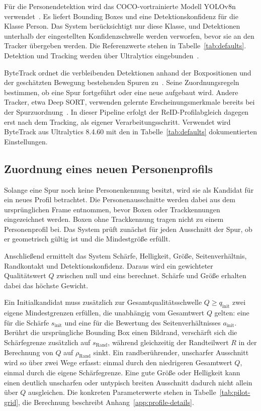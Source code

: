 \documentclass[runningheads,a4paper]{llncs}
\begin{document}
Für die Personendetektion wird das COCO-vortrainierte Modell YOLOv8n verwendet~\cite{ultralytics-yolov8}. Es liefert Bounding Boxes und eine Detektionskonfidenz für die Klasse Person. Das System berücksichtigt nur diese Klasse, und Detektionen unterhalb der eingestellten Konfidenzschwelle werden verworfen, bevor sie an den Tracker übergeben werden. Die Referenzwerte stehen in Tabelle~\ref{tab:defaults}. Detektion und Tracking werden über Ultralytics eingebunden~\cite{ultralytics-track}.

ByteTrack ordnet die verbleibenden Detektionen anhand der Boxpositionen und der geschätzten Bewegung bestehenden Spuren zu~\cite{zhang2022bytetrack}. Seine Zuordnungsregeln bestimmen, ob eine Spur fortgeführt oder eine neue aufgebaut wird. Andere Tracker, etwa Deep SORT, verwenden gelernte Erscheinungsmerkmale bereits bei der Spurzuordnung~\cite{wojke2017deepsort}. In dieser Pipeline erfolgt der ReID-Profilabgleich dagegen erst nach dem Tracking, als eigener Verarbeitungsschritt. Verwendet wird ByteTrack aus Ultralytics 8.4.60 mit den in Tabelle~\ref{tab:defaults} dokumentierten Einstellungen.

\subsection{Zuordnung eines neuen Personenprofils}
\label{sec:new-profile}
Solange eine Spur noch keine Personenkennung besitzt, wird sie als Kandidat für ein neues Profil betrachtet. Die Personenausschnitte werden dabei aus dem ursprünglichen Frame entnommen, bevor Boxen oder Trackkennungen eingezeichnet werden. Boxen ohne Trackkennung tragen nicht zu einem Personenprofil bei. Das System prüft zunächst für jeden Ausschnitt der Spur, ob er geometrisch gültig ist und die Mindestgrö{\ss}e erfüllt.

Anschlie{\ss}end ermittelt das System Schärfe, Helligkeit, Grö{\ss}e, Seitenverhältnis, Randkontakt und Detektionskonfidenz. Daraus wird ein gewichteter Qualitätswert $Q$ zwischen null und eins berechnet. Schärfe und Grö{\ss}e erhalten dabei das höchste Gewicht.

Ein Initialkandidat muss zusätzlich zur Gesamtqualitätsschwelle $Q\geq q_{\mathrm{init}}$ zwei eigene Mindestgrenzen erfüllen, die unabhängig vom Gesamtwert $Q$ gelten: eine für die Schärfe $s_{\mathrm{init}}$ und eine für die Bewertung des Seitenverhältnisses $a_{\mathrm{init}}$. Berührt die ursprüngliche Bounding Box einen Bildrand, verschärft sich die Schärfegrenze zusätzlich auf $s_{\mathrm{Rand}}$, während gleichzeitig der Randteilwert $R$ in der Berechnung von $Q$ auf $\rho_{\mathrm{Rand}}$ sinkt. Ein randberührender, unscharfer Ausschnitt wird so über zwei Wege erfasst: einmal durch den niedrigeren Gesamtwert $Q$, einmal durch die eigene Schärfegrenze. Eine gute Grö{\ss}e oder Helligkeit kann einen deutlich unscharfen oder untypisch breiten Ausschnitt dadurch nicht allein über $Q$ ausgleichen. Die konkreten Parameterwerte stehen in Tabelle~\ref{tab:pilot-grid}, die Berechnung beschreibt Anhang~\ref{app:profile-details}.
\end{document}
